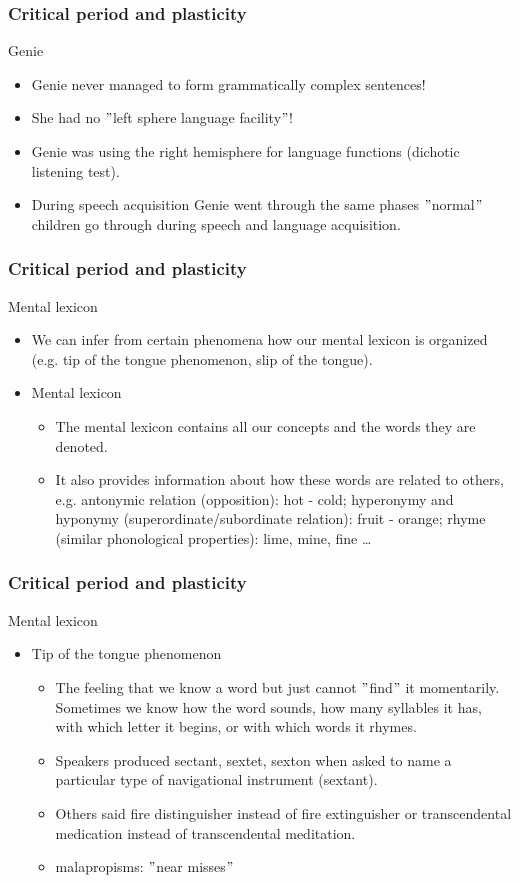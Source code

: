 \documentclass[12pt, table]{beamer}
\begin{document}
\begin{frame}
\frametitle{Critical period and plasticity}
Genie
\begin{itemize}
\item Genie never managed to form grammatically complex sentences!
\item She had no $"$left sphere language facility$"$!
\item Genie was using the right hemisphere for language functions (dichotic listening test).
\item During speech acquisition Genie went through the same phases $"$normal$"$ children go through during speech and language acquisition.
\end{itemize}
\end{frame}

\begin{frame}
\frametitle{Critical period and plasticity}
Mental lexicon
\begin{itemize}
\item We can infer from certain phenomena how our mental lexicon is organized (e.g. tip of the tongue phenomenon, slip of the tongue).
\item Mental lexicon 
\begin{itemize}
\item The mental lexicon contains all our concepts and the words they are denoted. 
\item It also provides information about how these words are related to others, e.g. antonymic relation (opposition): hot - cold; hyperonymy and hyponymy (superordinate/subordinate relation): fruit - orange; rhyme (similar phonological properties): lime, mine, fine \dots
\end{itemize}
\end{itemize}
\end{frame}

\begin{frame}
\frametitle{Critical period and plasticity}
Mental lexicon
\begin{itemize}
\item Tip of the tongue phenomenon
\begin{itemize}
\item The feeling that we know a word but just cannot $"$find$"$ it momentarily. Sometimes we know how the word sounds, how many syllables it has, with which letter it begins, or with which words it rhymes.
\item Speakers produced sectant, sextet, sexton when asked to name a particular type of navigational instrument (sextant).
\item Others said fire distinguisher instead of fire extinguisher or transcendental medication instead of transcendental meditation.
\item malapropisms: $"$near misses$"$
\end{itemize}
\end{itemize}
\end{frame}
\end{document}

